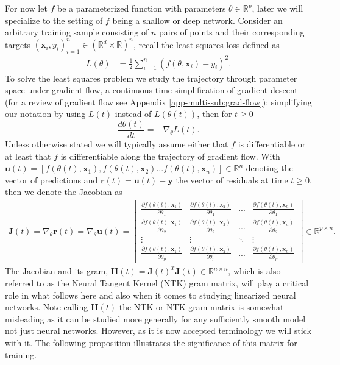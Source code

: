 \documentclass[
  letterpaper,
  DIV=11,
  numbers=noendperiod]{scrartcl}
\begin{document}
For now let \(f\) be a parameterized function with parameters
\(\theta \in \mathbb{R}^p\), later we will specialize to the setting of
\(f\) being a shallow or deep network. Consider an arbitrary training
sample consisting of \(n\) pairs of points and their corresponding
targets
\(({\bm{x}}_i, y_i)_{i=1}^n \in (\mathbb{R}^d \times \mathbb{R})^n\),
recall the least squares loss defined as \begin{align*}
    L(\theta) &= \frac{1}{2}\sum_{i=1}^n (f(\theta, {\bm{x}}_i) - y_i)^2.
\end{align*} To solve the least squares problem we study the trajectory
through parameter space under gradient flow, a continuous time
simplification of gradient descent (for a review of gradient flow see
Appendix \ref{app-multi-sub:grad-flow}): simplifying our notation by
using \(L(t)\) instead of \(L(\theta(t))\), then for \(t\geq 0\)
\begin{equation} \label{opt2-eq:grad-flow}
    \frac{d \theta(t)}{dt} = - \nabla_{\theta} L(t).
\end{equation} Unless otherwise stated we will typically assume either
that \(f\) is differentiable or at least that \(f\) is differentiable
along the trajectory of gradient flow. With
\({\bm{u}}(t) = [f(\theta(t), {\bm{x}}_1), f(\theta(t), {\bm{x}}_2)... f(\theta(t), {\bm{x}}_n)] \in \mathbb{R}^n\)
denoting the vector of predictions and
\({\bm{r}}(t) = {\bm{u}}(t) - {\bm{y}}\) the vector of residuals at time
\(t \geq 0\), then we denote the Jacobian as \begin{align*}
{\bm{J}}(t) = \nabla_\theta {\bm{r}}(t)= \nabla_\theta {\bm{u}}(t) =
  \begin{bmatrix}
    \frac{\partial f(\theta(t), {\mathbf{x}}_1) }{\partial \theta_1} & \frac{\partial f(\theta(t), {\bm{x}}_2) }{\partial \theta_1} & ... & \frac{\partial f(\theta(t), {\bm{x}}_n) }{\partial \theta_1} \\
    \frac{\partial f(\theta(t), {\bm{x}}_1) }{\partial \theta_2} & \frac{\partial f(\theta(t), {\bm{x}}_2) }{\partial \theta_2} & ... & \frac{\partial f(\theta(t), {\bm{x}}_n) }{\partial \theta_2} \\
    \vdots & \vdots & \ddots & \vdots\\
    \frac{\partial f(\theta(t), {\bm{x}}_1) }{\partial \theta_p} & \frac{\partial f(\theta(t), {\bm{x}}_2) }{\partial \theta_p} & ... & \frac{\partial f(\theta(t), {\bm{x}}_n) }{\partial \theta_p} 
  \end{bmatrix}
  \in \mathbb{R}^{p \times n}.
\end{align*} The Jacobian and its gram,
\({\bm{H}}(t) = {\bm{J}}(t)^T {\bm{J}}(t) \in \mathbb{R}^{n \times n}\),
which is also referred to as the Neural Tangent Kernel (NTK) gram
matrix, will play a critical role in what follows here and also when it
comes to studying linearized neural networks. Note calling
\({\bm{H}}(t)\) the NTK or NTK gram matrix is somewhat misleading as it
can be studied more generally for any sufficiently smooth model not just
neural networks. However, as it is now accepted terminology we will
stick with it. The following proposition illustrates the significance of
this matrix for training.
\end{document}
